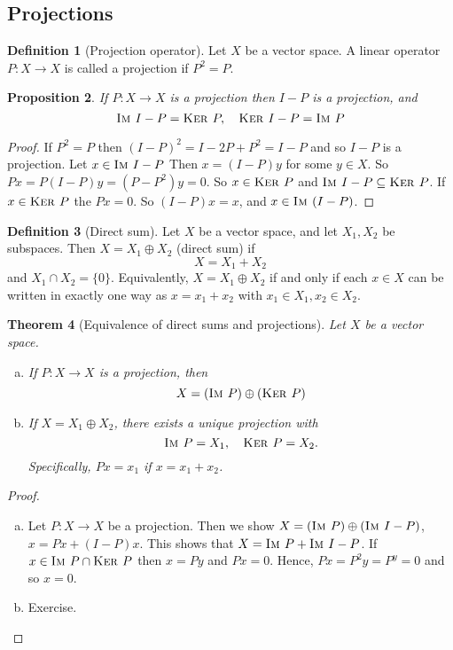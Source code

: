 \documentclass[10pt, oneside, reqno]{amsart}
\theoremstyle{plain}%
\newtheorem{thm}{Theorem}[section]
\newtheorem{prop}[thm]{Proposition}
\theoremstyle{definition}
\newtheorem{defn}[thm]{Definition}
\theoremstyle{remark}
\newcommand{\im}{\textsc{Im\ }}
\renewcommand{\ker}{\textsc{Ker\ }}
\begin{document}
\subsection{Projections} %
\label{sub:projections}

\begin{defn}[Projection operator]
	Let $X$ be a vector space.  A linear operator $P : X \rightarrow X$ is called a projection if $P^2 = P$.
\end{defn}
\begin{prop}
	If $P : X \rightarrow X$ is a projection then $I - P$ is a projection, and \[
		\im I - P= \ker P, \quad \ker I - P = \im P
	\]
\end{prop}

\begin{proof}
	If $P^2 = P$ then $(I - P)^2 = I - 2P + P^2 = I - P$ and so $I -  P$ is a projection.  Let $x \in \im I-P$  Then $x = (I - P)y$ for some $y \in X$.  So $P x = P(I - P)y = (P - P^2) y = 0$.  So $x \in \ker P$ and $\im I - P \subseteq \ker P$.  If $x \in \ker P$ the $Px = 0$.  So $(I - P) x = x$, and $x \in \im(I - P)$. 
\end{proof}

\begin{defn}[Direct sum]
	Let $X$ be a vector space, and let $X_1, X_2$ be subspaces.  Then $X = X_1 \oplus X_2$ (direct sum) if \[
		X = X_1 + X_2
	\] and $X_1 \cap X_2 = \{ 0 \}$.  Equivalently, $X = X_1 \oplus X_2$ if and only if each $x \in X$ can be written in exactly one way as $x = x_1 + x_2$ with $x_1 \in X_1, x_2 \in X_2$.  
\end{defn}
\begin{thm}[Equivalence of direct sums and projections]
	Let $X$ be a vector space.  \begin{enumerate}[(a)]
		\item If $P : X \rightarrow X$ is a projection, then \[
			X = (\im P) \oplus (\ker P) 
		\] 
		\item If $X = X_1 \oplus X_2$, there exists a unique projection with \[
			\im P = X_1, \quad \ker P = X_2.
		\] Specifically, $Px = x_1$ if $x = x_1 + x_2$. 
	\end{enumerate}
\end{thm}

\begin{proof}
	\begin{enumerate}[(a)]
		\item Let $P : X \rightarrow X$ be a projection.  Then we show $X = (\im P) \oplus (\im I - P)$, $x = Px + (I - P) x$.  This shows that $X = \im P + \im I - P$.  If $x \in \im P \cap \ker P$ then $x = Py$ and $Px = 0$.  Hence, $Px = P^2 y = P^y = 0$ and so $ x = 0$.
		\item Exercise.  
	\end{enumerate}
\end{proof}
\end{document}
